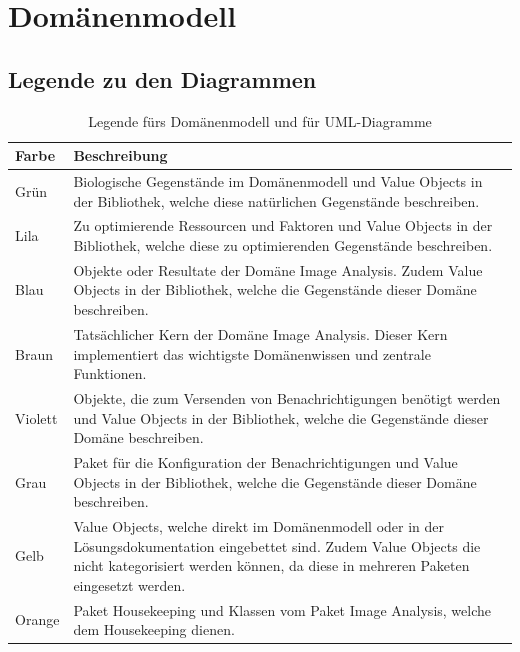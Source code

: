 


\section{Domänenmodell}
\subsection{Legende zu den Diagrammen}
\begin{table}[H]
	\centering	
	
	\begin{tabular}{ p{2cm}  p{12cm}  }
		
		\toprule[1pt]
		\rowcolor{maroon!30}	
		Farbe & Beschreibung \\
		
		\midrule
Grün \cellcolor[RGB]{204,235,197}&  Biologische Gegenstände im Domänenmodell und Value Objects in der Bibliothek, welche diese natürlichen Gegenstände beschreiben. \\
Lila \cellcolor[RGB]{253,218,236} & Zu optimierende Ressourcen und Faktoren und Value Objects in der Bibliothek,  welche diese zu optimierenden Gegenstände beschreiben.\\
Blau\cellcolor[RGB]{179,205,227} &  Objekte oder Resultate der Domäne \flqq{}Image Analysis\frqq{}. Zudem Value Objects in der Bibliothek, welche die Gegenstände dieser Domäne beschreiben. \\
Braun \cellcolor[RGB]{229,216,189}& Tatsächlicher Kern der Domäne \flqq{}Image Analysis\frqq{}. Dieser Kern implementiert das wichtigste Domänenwissen und zentrale Funktionen.\\			
Violett \cellcolor[RGB]{222,203,228} & Objekte, die zum Versenden von Benachrichtigungen benötigt werden und Value Objects in der Bibliothek, welche die Gegenstände dieser Domäne beschreiben.\\
Grau\cellcolor[RGB]{242,242,242} &  Paket für die Konfiguration der Benachrichtigungen und Value Objects in der Bibliothek, welche die Gegenstände dieser Domäne beschreiben.\\		
Gelb \cellcolor[RGB]{255,255,204}& Value Objects, welche direkt im Domänenmodell oder in der Lösungsdokumentation eingebettet sind. Zudem Value Objects die nicht kategorisiert werden können, da diese in mehreren Paketen eingesetzt werden. \\		
Orange \cellcolor[RGB]{254,217,166} &  Paket Housekeeping und Klassen vom Paket \flqq{}Image Analysis\frqq{}, welche dem Housekeeping dienen. \\
		
		\bottomrule
		
	\end{tabular}
	\caption{Legende fürs Domänenmodell und für UML-Diagramme}
	\label{tab: Legende fürs Domänenmodell und für die UML-Diagramme als Lösungsdokumentation}
\end{table}


